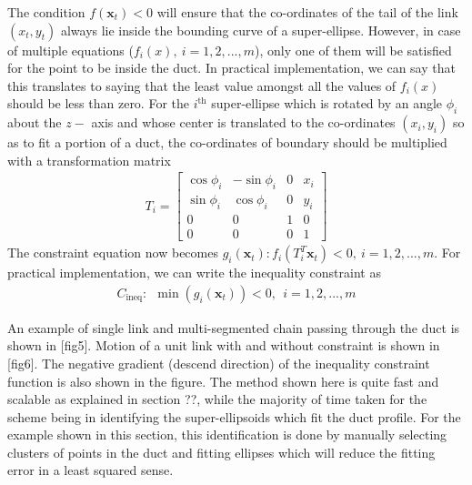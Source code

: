 \documentclass[12pt,a4]{article}
\begin{document}
The condition $f(\textbf{x}_t)<0$ will ensure that the co-ordinates of the tail of the link $(x_t,y_t)$ always lie inside the bounding curve of a super-ellipse. However, in case of multiple equations (${f_i(x)},~ i=1,2,...,m$), only one of them will be satisfied for the point to be inside the duct. In practical implementation, we can say that this translates to saying that the least value amongst all the values of ${f_i(x)}$ should be less than zero. For the $i^\text{th}$ super-ellipse which is rotated by an angle $\phi_i$ about the $z-$ axis and whose center is translated to the co-ordinates $(x_i,y_i)$ so as to fit a portion of a duct, the co-ordinates of boundary should be multiplied with a transformation matrix
\begin{align}
T_i = \begin{bmatrix}
\cos \phi_i & -\sin\phi_i & 0 & x_i\\
\sin \phi_i & \cos\phi_i & 0 & y_i\\
0 & 0 & 1 &0\\
0 & 0 & 0 & 1
\end{bmatrix}
\end{align}
The constraint equation now becomes $g_i(\textbf{x}_t) : f_i(T_i^T\textbf{x}_t)< 0,~ i=1,2,...,m$. For practical implementation, we can write the inequality constraint as 
\begin{align}
\label{eq: min_and_mingx}
C_{\text{ineq}}:~~ \min\left(g_i(\textbf{x}_t)\right) < 0,~~ i=1,2,...,m 
\end{align}

An example of single link and multi-segmented chain passing through the duct is shown in [fig5]. Motion of a unit link with and without constraint is shown in [fig6]. The negative gradient (descend direction) of the inequality constraint function is also shown in the figure. The method shown here is quite fast and scalable as explained in section ??, while the majority of time taken for the scheme being in identifying the super-ellipsoids which fit the duct profile. For the example shown in this section, this identification is done by manually selecting clusters of points in the duct and fitting ellipses which will reduce the fitting error in a least squared sense.

%
\end{document}
